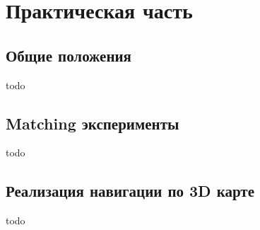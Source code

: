 \chapter{Практическая часть}

\section{Общие положения}
todo

\section{Matching эксперименты}
todo

\section{Реализация навигации по 3D карте}
todo

\newpage